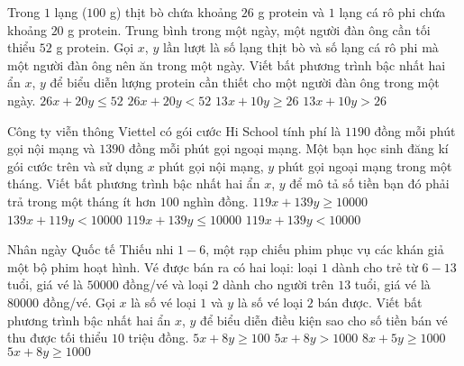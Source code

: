 \begin{ex}%
	Trong $1$ lạng ($100$ g) thịt bò chứa khoảng $26$ g protein và $1$ lạng cá rô phi chứa khoảng $20$ g protein. Trung bình trong một ngày, một người đàn ông cần tối thiểu $52$ g protein. Gọi $x$, $y$ lần lượt là số lạng thịt bò và số lạng cá rô phi mà một người đàn ông nên ăn trong một ngày. Viết bất phương trình bậc nhất hai ẩn $x$, $y$ để biểu diễn lượng protein cần thiết cho một người đàn ông trong một ngày.
	\choice
	{$26x+20y\le 52$}
	{$26x+20y< 52$}
	{\True $13x+10y\ge 26$}
	{$13x+10y> 26$}
\end{ex}
\begin{ex}%
	Công ty viễn thông Viettel có gói cước Hi School tính phí là $1190$ đồng mỗi phút gọi nội mạng và $1390$ đồng mỗi phút gọi ngoại mạng. Một bạn học sinh đăng kí gói cước trên và sử dụng $x$ phút gọi nội mạng, $y$ phút gọi ngoại mạng trong một tháng. Viết bất phương trình bậc nhất hai ẩn $x$, $y$ để mô tả số tiền bạn đó phải trả trong một tháng ít hơn $100$ nghìn đồng.
	\choice
	{$119x+139y\ge 10000$}
	{$139x+119y< 10000$}
	{$119x+139y\le 10000$}
	{\True $119x+139y< 10000$}
\end{ex}
\begin{ex}%
	Nhân ngày Quốc tế Thiếu nhi $1-6$, một rạp chiếu phim phục vụ các khán giả một bộ phim hoạt hình. Vé được bán ra có hai loại: loại $1$ dành cho trẻ từ $6-13$ tuổi, giá vé là $50000$ đồng/vé và loại $2$ dành cho người trên $13$ tuổi, giá vé là $80000$ đồng/vé. Gọi $x$ là số vé loại $1$ và $y$ là số vé loại $2$ bán được. Viết bất phương trình bậc nhất hai ẩn $x$, $y$ để biểu diễn điều kiện sao cho số tiền bán vé thu được tối thiểu $10$ triệu đồng.
	\choice
	{$5x+8y\ge 100$}
	{$5x+8y> 1000$}
	{$8x+5y\ge 1000$}
	{\True $5x+8y\ge 1000$}
\end{ex}

